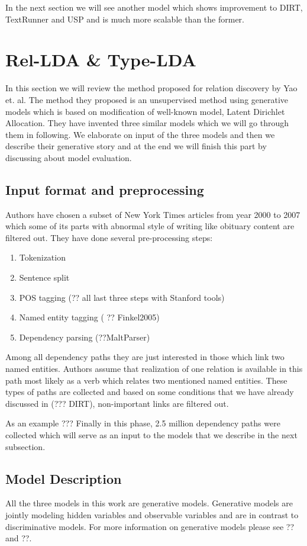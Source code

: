 \documentclass[12pt]{report}
\begin{document}
  In the next section we will see another model which shows improvement to DIRT, TextRunner and USP 
  and is much more scalable than the former.
     

\section{Rel-LDA \& Type-LDA}
\label{ch:unsupervised}

In this section we will review the method proposed for relation discovery  by Yao et. al. 
The method they  proposed is an unsupervised method using generative models which is based on 
modification of well-known model, Latent Dirichlet Allocation. 
They have invented three similar models which we will go through them in following. 
We elaborate on input of the three models and then we describe their generative story 
and at the end we will finish this part by discussing about  model evaluation.

\subsection{Input format and preprocessing}
\label{ch:input}
Authors have chosen a subset of New York Times articles from year 2000 to 2007 which some of its parts with
abnormal style of writing like obituary content are filtered out.
They have done several pre-processing steps:
\begin{enumerate}
\item Tokenization
\item Sentence split
\item POS tagging (?? all last three steps with Stanford tools)
\item Named entity tagging ( ?? Finkel2005)
\item Dependency parsing (??MaltParser)
\end{enumerate}
Among all dependency paths they are just interested in those which link two named entities.
 Authors assume that realization of one relation is available in this 
 path most likely as a verb which relates two mentioned named entities. These types of 
 paths are collected and based on some conditions that we have already discussed in (??? DIRT), non-important links are filtered out.
 
 As an example ???
 Finally in this phase, 2.5 million dependency paths were collected 
 which will serve as an input to the models that we describe in the next subsection.


\subsection {Model Description}
\label{ch:model}
All the three models in this work are generative models. Generative models are jointly modeling hidden variables and observable variables and 
are in contrast to discriminative models. For more information on generative models please see ?? and ??.\\
\end{document}
